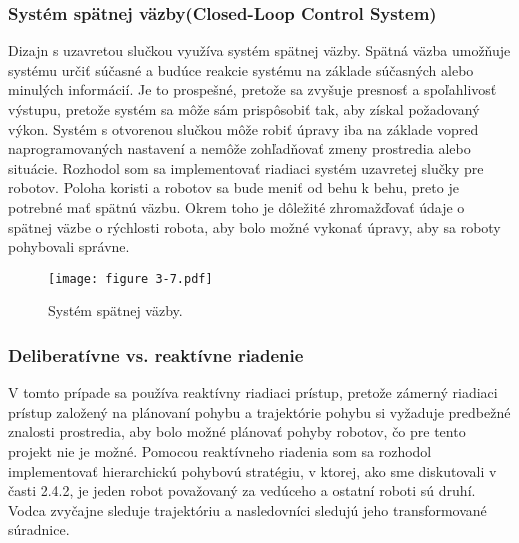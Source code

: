 \subsubsection{Systém spätnej väzby(Closed-Loop Control System)}
Dizajn s uzavretou slučkou využíva systém spätnej väzby. Spätná väzba umožňuje systému určiť súčasné a budúce reakcie systému na základe súčasných alebo minulých informácií. Je to prospešné, pretože sa zvyšuje presnosť a spoľahlivosť výstupu, pretože systém sa môže sám prispôsobiť tak, aby získal požadovaný výkon. Systém s otvorenou slučkou môže robiť úpravy iba na základe vopred naprogramovaných nastavení a nemôže zohľadňovať zmeny prostredia alebo situácie.
Rozhodol som sa implementovať riadiaci systém uzavretej slučky pre robotov. Poloha koristi a robotov sa bude meniť od behu k behu, preto je potrebné mať spätnú väzbu. Okrem toho je dôležité zhromažďovať údaje o spätnej väzbe o rýchlosti robota, aby bolo možné vykonať úpravy, aby sa roboty pohybovali správne. 
\begin{figure}[ht!]
    \centering
    \texttt{[image: figure 3-7.pdf]}
    \caption{Systém spätnej väzby.}
    \label{o:311}
\end{figure}

\subsubsection{Deliberatívne vs. reaktívne riadenie}
V tomto prípade sa používa reaktívny riadiaci prístup, pretože zámerný riadiaci prístup založený na plánovaní pohybu a trajektórie pohybu si vyžaduje predbežné 
znalosti prostredia, aby bolo možné plánovať pohyby robotov, čo pre  tento projekt nie je 
možné. Pomocou reaktívneho riadenia som sa rozhodol implementovať hierarchickú pohybovú 
stratégiu, v ktorej, ako sme diskutovali v časti 2.4.2, je jeden robot považovaný za vedúceho a 
ostatní roboti sú druhí. Vodca zvyčajne sleduje trajektóriu a nasledovníci sledujú jeho 
transformované súradnice. 